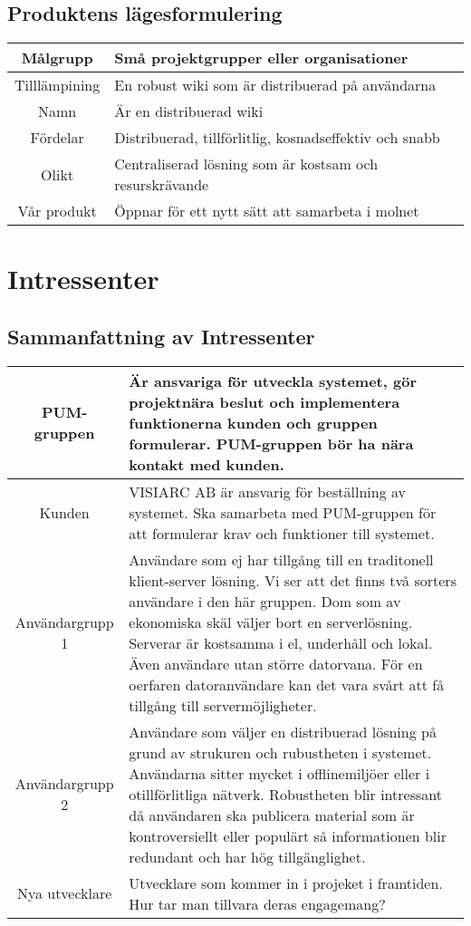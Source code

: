 \subsection{Produktens lägesformulering} %
\begin{tabular}{|c|m{15 cm}|}
\hline
Målgrupp & Små projektgrupper eller organisationer\\
\hline
Tilllämpining & En robust wiki som är distribuerad på användarna \\
\hline
Namn & Är en distribuerad wiki  \\
\hline 
Fördelar & Distribuerad, tillförlitlig, kosnadseffektiv och snabb \\
\hline
Olikt & Centraliserad lösning som är kostsam och resurskrävande \\
\hline
Vår produkt & Öppnar för ett nytt sätt att samarbeta i molnet \\
\hline
\end{tabular}
\section{Intressenter}
\subsection{Sammanfattning av Intressenter}
\begin{tabular}{|c|m{14 cm}|}
 \hline
PUM-gruppen & Är ansvariga för utveckla systemet, gör projektnära beslut och implementera funktionerna kunden och gruppen formulerar.  PUM-gruppen bör ha nära kontakt med kunden. \\ \hline
Kunden & VISIARC AB är ansvarig för beställning av systemet. Ska samarbeta med PUM-gruppen för att formulerar krav och funktioner till systemet. \\ \hline
Användargrupp 1 & Användare som ej har tillgång till en traditonell klient-server lösning. Vi ser att det finns två sorters användare i den här gruppen. Dom som av ekonomiska skäl väljer bort en serverlösning. Serverar är kostsamma i el, underhåll och lokal. Även användare utan större datorvana. För en oerfaren datoranvändare kan det vara svårt att få tillgång till servermöjligheter. \\ \hline
Användargrupp 2 & Användare som väljer en distribuerad lösning på grund av strukuren och rubustheten i systemet. Användarna sitter mycket i offlinemiljöer eller i otillförlitliga nätverk. Robustheten blir intressant då användaren ska publicera material som är kontroversiellt eller populärt så informationen blir redundant och har hög tillgänglighet.\\ \hline
Nya utvecklare & Utvecklare som kommer in i projeket i framtiden. Hur tar man tillvara deras engagemang?\\ \hline
\end{tabular}
